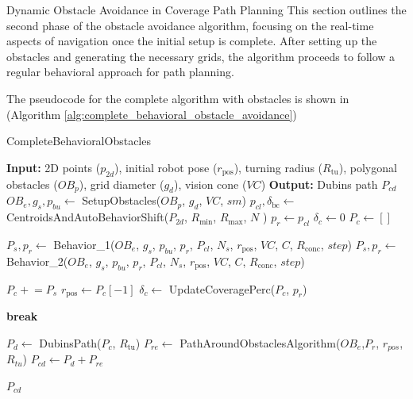 Dynamic Obstacle Avoidance in Coverage Path Planning
This section outlines the second phase of the obstacle avoidance algorithm, focusing on the real-time aspects of navigation once the initial setup is complete. After setting up the obstacles and generating the necessary grids, the algorithm proceeds to follow a regular behavioral approach for path planning.

\vspace*{6mm}  

The pseudocode for the complete algorithm with obstacles is shown in (Algorithm \autoref{alg:complete_behavioral_obstacle_avoidance})


\vspace*{6mm}  






\begin{algorithm}[H]
    \caption{CompleteBehavioralObstacles}
    \label{alg:complete_behavioral_obstacle_avoidance}
    \begin{algorithmic}[1]
    \Statex \textbf{Input:} 2D points ($p_{2d}$), initial robot pose ($r_{\text{pos}}$), turning radius ($R_{\text{tu}}$), polygonal obstacles ($OB_p$), grid diameter ($g_d$), vision cone ($VC$) 
    \Statex \textbf{Output:} Dubins path $P_{cd}$
    \newline
    \State $OB_e, g_s, p_{bu} \leftarrow$ SetupObstacles($OB_p$, $g_d$, $VC$, $sm$)
    \State $p_{cl}, \delta_{\text{bc}} \leftarrow$ CentroidsAndAutoBehaviorShift($P_{2d}$, $R_{\text{min}}$, $R_{\text{max}}$, $N$ )
    \State $p_r \leftarrow p_{cl}$
    \State $\delta_c \leftarrow 0$
    \State $P_c \leftarrow []$
    
            \State $P_s, p_r \leftarrow$ Behavior\_1($OB_e$, $g_s$, $p_{bu}$, $p_r$, $P_{cl}$, $N_s$, $r_{\text{pos}}$, $VC$, $C$, $R_{\text{conc}}$, $step$)
        \Else
            \State $P_s, p_r \leftarrow$ Behavior\_2($OB_e$, $g_s$, $p_{bu}$, $p_r$, $P_{cl}$, $N_s$, $r_{\text{pos}}$, $VC$, $C$, $R_{\text{conc}}$, $step$)
        \EndIf
        
        \State $P_c \mathrel{+}= P_s$
        \State $r_{\text{pos}} \leftarrow P_c[-1]$
        \State $\delta_c \leftarrow$ UpdateCoveragePerc($P_c$, $p_r$)
        
            \State \textbf{break}
        \EndIf
    \EndWhile
    
    \State $P_d \leftarrow$ DubinsPath($P_c$, $R_{\text{tu}}$)
    \State $P_{re} \leftarrow$ PathAroundObstaclesAlgorithm($OB_e$,$P_r$, $r_{pos}$, $R_{tu}$)
    \State $P_{cd} \leftarrow P_d + P_{re}$

    \State \Return $P_{cd}$
    \end{algorithmic}
\end{algorithm}


